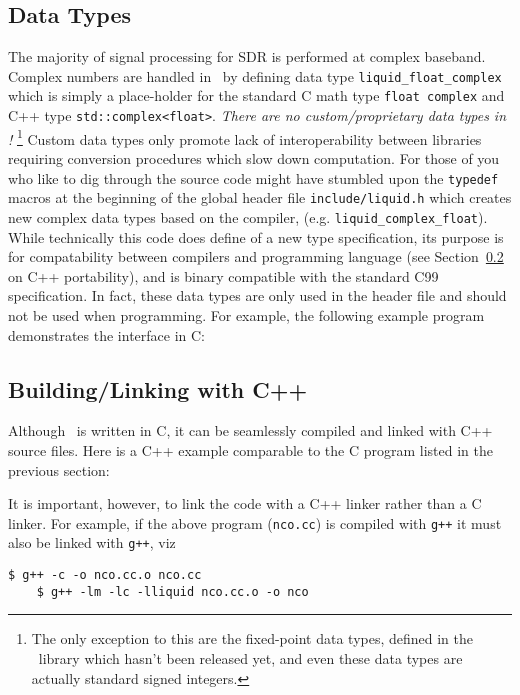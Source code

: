\subsection{Data Types}
\label{section:data_structures:data_types}
The majority of signal processing for SDR is performed at complex baseband.
Complex numbers are handled in \liquid\ by defining data type
{\tt liquid\_float\_complex} which is simply a place-holder for the
standard
C math type {\tt float complex} and C++ type {\tt std::complex<float>}.
{\em There are no custom/proprietary data types in \liquid!}%
\footnote{
    The only exception to this are the fixed-point data types,
    defined in the \liquidfpm\ library which hasn't been released yet,
    and even these data types are actually standard signed integers.}
Custom data types only promote lack of interoperability between
libraries requiring conversion procedures which slow down computation.
For those of you who like to dig through the source code might have
stumbled upon the {\tt typedef} macros at the beginning of the global 
header file {\tt include/liquid.h} which creates new complex data types
based on the compiler, 
(e.g. {\tt liquid\_complex\_float}).
While technically this code does define of a new type specification,
its purpose is for compatability between compilers and programming
language
(see Section~\ref{section:data_structures:c++} on C++ portability),
and is binary compatible with the standard C99 specification.
In fact, these data types are only used in the header file and should
not be used when programming.
For example, the following example program demonstrates the interface in
C:
%

%


\subsection{Building/Linking with C++}
\label{section:data_structures:c++}
Although \liquid\ is written in C, it can be seamlessly compiled and linked
with C++ source files.
Here is a C++ example comparable to the C program listed in the previous
section:
%

%
It is important, however, to link the code with a C++ linker rather than
a C linker.
For example, if the above program ({\tt nco.cc}) is compiled with
{\tt g++} it must also be linked with {\tt g++}, viz
%
\begin{Verbatim}[fontsize=\small]
    $ g++ -c -o nco.cc.o nco.cc
    $ g++ -lm -lc -lliquid nco.cc.o -o nco
\end{Verbatim}
%

